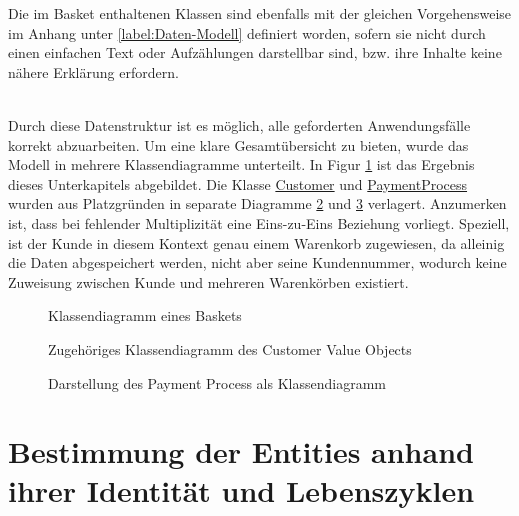 \vspace{1em}
Die im Basket enthaltenen Klassen sind ebenfalls mit der gleichen Vorgehensweise im Anhang unter \ref{label:Daten-Modell} definiert worden, sofern sie nicht durch einen einfachen Text oder Aufzählungen darstellbar sind, bzw. ihre Inhalte keine nähere Erklärung erfordern. \\\\


Durch diese Datenstruktur ist es möglich, alle geforderten Anwendungsfälle korrekt abzuarbeiten. Um eine klare Gesamtübersicht zu bieten, wurde das Modell in mehrere Klassendiagramme unterteilt. In Figur \ref{fig:VO-Basket} ist das Ergebnis dieses Unterkapitels abgebildet. Die Klasse \ul{Customer} und \ul{PaymentProcess} wurden aus Platzgründen in separate Diagramme \ref{fig:VO-Customer} und \ref{fig:VO-Payment} verlagert. Anzumerken ist, dass bei fehlender Multiplizität eine Eins-zu-Eins Beziehung vorliegt. Speziell, ist der Kunde in diesem Kontext genau einem Warenkorb zugewiesen, da alleinig die Daten abgespeichert werden, nicht aber seine Kundennummer, wodurch keine Zuweisung zwischen Kunde und mehreren Warenkörben existiert.


\begin{figure}[htbp]
	\centering
	
	\caption{Klassendiagramm eines Baskets}
	\label{fig:VO-Basket}
\end{figure}

\begin{figure}[htbp]
	\centering
	
	\caption{Zugehöriges Klassendiagramm des Customer Value Objects}
	\label{fig:VO-Customer}
\end{figure}

\begin{figure}[htbp]
	\centering
	
	\caption{Darstellung des Payment Process als Klassendiagramm}
	\label{fig:VO-Payment}
\end{figure}



\section{Bestimmung der Entities anhand ihrer Identität und Lebenszyklen}

